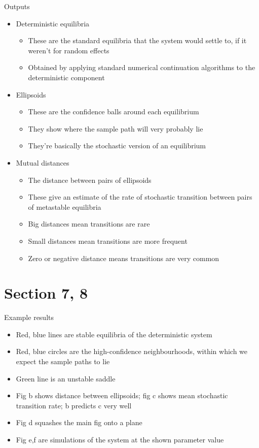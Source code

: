 \documentclass[presentation]{beamer}
\begin{document}
\begin{frame}[label={sec:orge03438d},plain]{Outputs}
\begin{itemize}
\item Deterministic equilibria
\begin{itemize}
\item These are the standard equilibria that the system would settle to, if it weren't for random effects
\item Obtained by applying standard numerical continuation algorithms to the deterministic component
\end{itemize}
\end{itemize}
\vfill
\begin{itemize}
\item Ellipsoids
\begin{itemize}
\item These are the confidence balls around each equilibrium
\item They show where the sample path will very probably lie
\item They're basically the stochastic version of an equilibrium
\end{itemize}
\end{itemize}
\vfill
\begin{itemize}
\item Mutual distances
\begin{itemize}
\item The distance between pairs of ellipsoids
\item These give an estimate of the rate of stochastic transition between pairs of metastable equilibria
\item Big distances mean transitions are rare
\item Small distances mean transitions are more frequent
\item Zero or negative distance means transitions are very common
\end{itemize}
\end{itemize}
\end{frame}

\section{Section 7, 8}
\label{sec:org8fd8487}
\begin{frame}[label={sec:orgf6a3ecc},plain]{Example results}
\begin{itemize}
\item Red, blue lines are stable equilibria of the deterministic system
\item Red, blue circles are the high-confidence neighbourhoods, within which we expect the sample paths to lie
\item Green line is an unstable saddle
\item Fig b shows distance between ellipsoids; fig c shows mean stochastic transition rate; b predicts c very well
\item Fig d squashes the main fig onto a plane
\item Fig e,f are simulations of the system at the shown parameter value
\end{itemize}
\end{frame}
\end{document}
